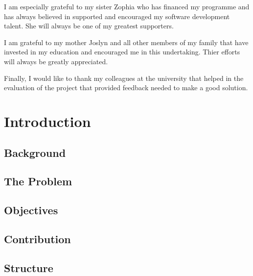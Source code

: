 \documentclass{mproj}
\begin{document}
I am especially grateful to my sister Zophia who has financed my programme and has always believed in supported and encouraged my software development talent. She will always be one of my greatest supporters.

I am grateful to my mother Joslyn and all other members of my family that have invested in my education and encouraged me in this undertaking. Thier efforts will always be greatly appreciated.

Finally, I would like to thank my colleagues at the university that helped in the evaluation of the project that provided feedback needed to make a good solution.

\tableofcontents




\chapter{Introduction}\label{intro}

\section{Background}

\section{The Problem}

\section{Objectives}

\section{Contribution}

\section{Structure}

\end{document}
